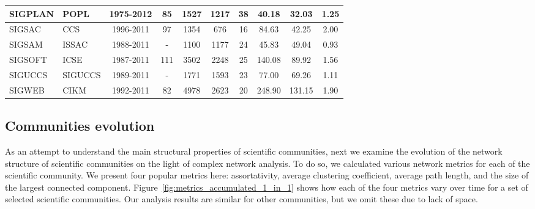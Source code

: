 \begin{table}[!htb]
{\begin{tabular}{|l|l|c|c|c|c|c|c|c|c|}
SIGPLAN & POPL & 1975-2012 & 85 & 1527 & 1217 & 38 & 40.18 & 32.03 & 1.25\\ \hline
SIGSAC & CCS & 1996-2011 & 97 & 1354 & 676 & 16 & 84.63 & 42.25 & 2.00\\ \hline
SIGSAM & ISSAC & 1988-2011 & - & 1100 & 1177 & 24 & 45.83 & 49.04 & 0.93\\ \hline
SIGSOFT & ICSE & 1987-2011 & 111 & 3502 & 2248 & 25 & 140.08 & 89.92 & 1.56\\ \hline
SIGUCCS & SIGUCCS & 1989-2011 & - & 1771 & 1593 & 23 & 77.00 & 69.26 & 1.11\\ \hline
SIGWEB & CIKM & 1992-2011 & 82 & 4978 & 2623 & 20 & 248.90 & 131.15 & 1.90\\ \hline
\end{tabular}
}
\end{table}



\subsection{Communities evolution}

As an attempt to understand the main structural properties of scientific communities, next we examine the evolution of the network structure of scientific communities on the light
of complex network analysis.  To do so, we calculated various network metrics for each of the scientific community. We present four popular metrics here: assortativity, average
clustering coefficient, average path length, and the size of the largest connected component.  Figure~\ref{fig:metrics_accumulated_1_in_1} shows how each of the four metrics vary
over time for a set of selected scientific communities.  Our analysis results are similar for other communities, but we omit these due to lack of space.


